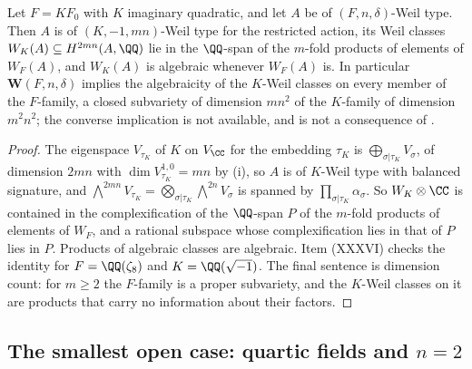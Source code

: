 \begin{proposition}\label{prop:composite}
Let $F=KF_{0}$ with $K$ imaginary quadratic, and let $A$ be of
$(F,n,\delta)$-Weil type. Then $A$ is of $(K,-1,mn)$-Weil type for the
restricted action, its Weil classes $W_{K}(A)\subseteq H^{2mn}(A,\QQ)$ lie in
the $\QQ$-span of the $m$-fold products of elements of $W_{F}(A)$, and
$W_{K}(A)$ is algebraic whenever $W_{F}(A)$ is. In particular
$\mathbf{W}(F,n,\delta)$ implies the algebraicity of the $K$-Weil classes on
every member of the $F$-family, a closed subvariety of dimension $mn^{2}$ of
the $K$-family of dimension $m^{2}n^{2}$; the converse implication is not
available, and  is not a consequence of
.
\end{proposition}

\begin{proof}
The eigenspace $V_{\tau_{K}}$ of $K$ on $V_{\CC}$ for the embedding
$\tau_{K}$ is $\bigoplus_{\sigma|\tau_{K}}V_{\sigma}$, of dimension $2mn$
with $\dim V_{\tau_{K}}^{1,0}=mn$ by (i), so $A$ is of
$K$-Weil type with balanced signature, and
$\bigwedge^{2mn}V_{\tau_{K}}=\bigotimes_{\sigma|\tau_{K}}\bigwedge^{2n}V_{\sigma}$
is spanned by $\prod_{\sigma|\tau_{K}}\alpha_{\sigma}$. So
$W_{K}\otimes\CC$ is contained in the complexification of the $\QQ$-span $P$ of
the $m$-fold products of elements of $W_{F}$, and a rational subspace whose
complexification lies in that of $P$ lies in $P$. Products of algebraic
classes are algebraic. Item (XXXVI) checks the identity for $F=\QQ(\zeta_{8})$
and $K=\QQ(\sqrt{-1})$. The final sentence is dimension count: for $m\ge2$ the
$F$-family is a proper subvariety, and the $K$-Weil classes on it are products
that carry no information about their factors.
\end{proof}


\subsection{The smallest open case: quartic fields and \texorpdfstring{$n=2$}{n=2}}
\label{ssec:quartic}

